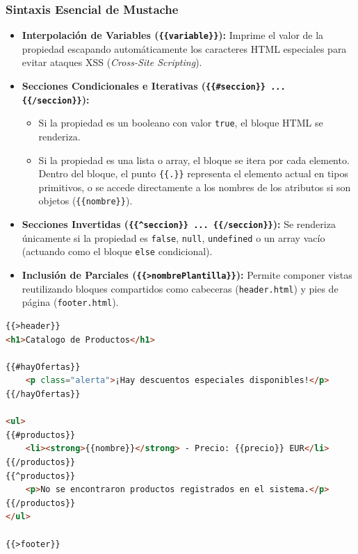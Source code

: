 \subsubsection{Sintaxis Esencial de Mustache}
\begin{itemize}
    \item \textbf{Interpolación de Variables (\texttt{\{\{variable\}\}}):} Imprime el valor de la propiedad escapando automáticamente los caracteres HTML especiales para evitar ataques XSS (\emph{Cross-Site Scripting}).
    \item \textbf{Secciones Condicionales e Iterativas (\texttt{\{\{\#seccion\}\} ... \{\{/seccion\}\}}):}
    \begin{itemize}
        \item Si la propiedad es un booleano con valor \texttt{true}, el bloque HTML se renderiza.
        \item Si la propiedad es una lista o array, el bloque se itera por cada elemento. Dentro del bloque, el punto \texttt{\{\{.\}\}} representa el elemento actual en tipos primitivos, o se accede directamente a los nombres de los atributos si son objetos (\texttt{\{\{nombre\}\}}).
    \end{itemize}
    \item \textbf{Secciones Invertidas (\texttt{\{\{\textasciicircum seccion\}\} ... \{\{/seccion\}\}}):} Se renderiza únicamente si la propiedad es \texttt{false}, \texttt{null}, \texttt{undefined} o un array vacío (actuando como el bloque \texttt{else} condicional).
    \item \textbf{Inclusión de Parciales (\texttt{\{\{>nombrePlantilla\}\}}):} Permite componer vistas reutilizando bloques compartidos como cabeceras (\texttt{header.html}) y pies de página (\texttt{footer.html}).
\end{itemize}

\begin{lstlisting}[language=html, caption={views/listado.html: Ejemplo de plantilla Mustache}]
{{>header}}
<h1>Catalogo de Productos</h1>

{{#hayOfertas}}
    <p class="alerta">¡Hay descuentos especiales disponibles!</p>
{{/hayOfertas}}

<ul>
{{#productos}}
    <li><strong>{{nombre}}</strong> - Precio: {{precio}} EUR</li>
{{/productos}}
{{^productos}}
    <p>No se encontraron productos registrados en el sistema.</p>
{{/productos}}
</ul>

{{>footer}}
\end{lstlisting}

